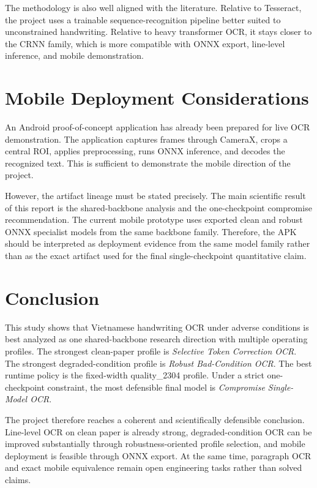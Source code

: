 \documentclass[12pt,a4paper]{article}
\begin{document}
The methodology is also well aligned with the literature. Relative to Tesseract, the project uses a trainable sequence-recognition pipeline better suited to unconstrained handwriting. Relative to heavy transformer OCR, it stays closer to the CRNN family, which is more compatible with ONNX export, line-level inference, and mobile demonstration.

\section{Mobile Deployment Considerations}
An Android proof-of-concept application has already been prepared for live OCR demonstration. The application captures frames through CameraX, crops a central ROI, applies preprocessing, runs ONNX inference, and decodes the recognized text. This is sufficient to demonstrate the mobile direction of the project.

However, the artifact lineage must be stated precisely. The main scientific result of this report is the shared-backbone analysis and the one-checkpoint compromise recommendation. The current mobile prototype uses exported clean and robust ONNX specialist models from the same backbone family. Therefore, the APK should be interpreted as deployment evidence from the same model family rather than as the exact artifact used for the final single-checkpoint quantitative claim.

\section{Conclusion}
This study shows that Vietnamese handwriting OCR under adverse conditions is best analyzed as one shared-backbone research direction with multiple operating profiles. The strongest clean-paper profile is \emph{Selective Token Correction OCR}. The strongest degraded-condition profile is \emph{Robust Bad-Condition OCR}. The best runtime policy is the fixed-width quality\_2304 profile. Under a strict one-checkpoint constraint, the most defensible final model is \emph{Compromise Single-Model OCR}.

The project therefore reaches a coherent and scientifically defensible conclusion. Line-level OCR on clean paper is already strong, degraded-condition OCR can be improved substantially through robustness-oriented profile selection, and mobile deployment is feasible through ONNX export. At the same time, paragraph OCR and exact mobile equivalence remain open engineering tasks rather than solved claims.
\end{document}
